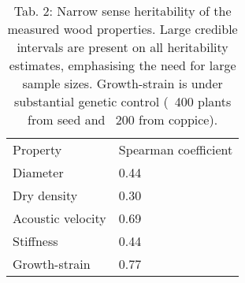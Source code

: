 


\begin{table}[]
\centering
\caption{Tab. 2: Narrow sense heritability of the measured wood properties. Large credible intervals are present on all heritability estimates, emphasising the need for large sample sizes. Growth-strain is under substantial genetic control (~400 plants from seed and ~200 from coppice).}
\label{my-label}
\begin{tabular}{ll}
Property          & Spearman coefficient \\
Diameter          & 0.44                 \\
Dry density       & 0.30                 \\
Acoustic velocity & 0.69                 \\
Stiffness         & 0.44                 \\
Growth-strain     & 0.77                
\end{tabular}
\end{table}
